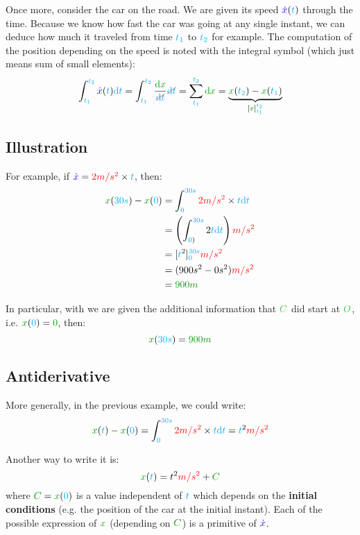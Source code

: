 Once more, consider the car on the road. We are given its speed
$\textcolor{blue}{\dot x}(\textcolor{cyan}{t})$ through the time. Because we know how fast the
car was going at any single instant, we can deduce how much it traveled
from time $\textcolor{cyan}{t_1}$ to $\textcolor{cyan}{t_2}$ for example. The computation
of the position depending on the speed is
noted with the integral symbol (which just means sum of small elements):
\[
\int_{\delay{t_1}}^{\delay{t_2}} \speed{\dot x}(\delay{t}) \delay{\dt}
= \int_{\delay{t_1}}^{\delay{t_2}} \frac {\dist{\d x}} {\strike[red]{\delay{\dt}}} \strike[red]{\delay{\dt}}
= \sum_{\delay{t_1}}^{\delay{t_2}} \dist{\d x}
= \underbrace{
	\dist{x}(\delay{t_2}) - \dist{x}(\delay{t_1})
}_{[\dist{x}]_{\delay{t_1}}^{\delay{t_2}}}
\]

\subsection{Illustration}

For example, if $\textcolor{blue}{\dot x} = \textcolor{red}{2m/s^2} \times \textcolor{cyan}{t}$, then:
\begin{align*}
\dist{x}(\delay{30s}) - \dist{x}(\delay{0})
&= \int_{\delay{0}}^{\delay{30s}} \accel{2m/s^2} \times \delay{t} \delay{\dt} \\
&= \left(\int_{\delay{0})}^{\delay{30s}} 2 \delay{t} \delay{\dt}\right) \accel{m/s^2} \\
&= [\delay{t}^2]_{\delay{0}}^{\delay{30s}} \accel{m/s^2} \\
&= (900s^2 - 0s^2) \accel{m/s^2} \\
&= \dist{900m}
\end{align*}

In particular, with we are given the additional information that $\posit{C}$
did start at $\posit{O}$, i.e.  $\dist{x}(\delay{0}) = \dist{0}$, then:
\[
\dist{x}(\delay{30s}) = \dist{900m}
\]

\subsection{Antiderivative}

More generally, in the previous example, we could write:
\[
\dist{x}(\delay{t}) - \dist{x}(\delay{0})
= \int_{\delay{0}}^{\delay{30s}} \accel{2m/s^2} \times \delay{t} \delay{\dt}
= \delay{t}^2 \accel{m/s^2}
\]

Another way to write it is:
\[
\dist{x}(\delay{t})
= t^2 \accel{m/s^2} + \dist{C}
\]
where $\dist{C} = \dist{x}(\delay{0})$ is a value independent of
$\textcolor{cyan}{t}$ which depends on the \textbf{initial conditions} (e.g. the
position of the car at the initial instant). Each of the possible
expression of $\dist{x}$ (depending on $\dist{C}$) is a primitive of
$\textcolor{blue}{\dot x}$.

